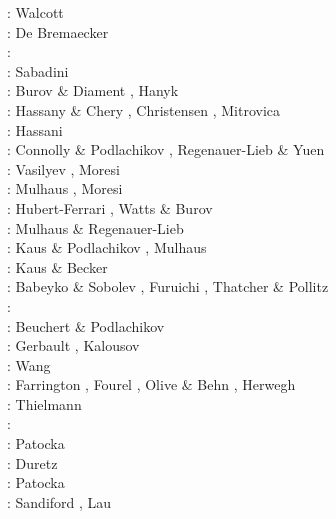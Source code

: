 \begin{scriptsize}
\nineteenseventy: Walcott \cite{walc70} \\
\nineteenseventyseven: De Bremaecker \cite{debr77}\\
\nineteeneightyfour:\cite{yusa84}\\
\nineteeneightysix: Sabadini \etal \cite{sayp86}\\
\nineteenninetyfive: Burov \& Diament \cite{budi95}, Hanyk \etal \cite{hamy95}\\
\nineteenninetysix: Hassany \& Chery \cite{hach96b}, Christensen \cite{chri96b}, Mitrovica \cite{mitr96}\\
\nineteenninetyseven: Hassani \etal \cite{hajc97}\\
\nineteenninetyeight: Connolly \& Podlachikov \cite{copo98}, Regenauer-Lieb \& Yuen \cite{reyu98}\\
\twothousandone: Vasilyev \etal \cite{vapy01}, Moresi \etal \cite{modm01}\\
\twothousandtwo: Mulhaus \etal \cite{mumh02}, Moresi \etal \cite{modm02}\\
\twothousandthree: Hubert-Ferrari \etal \cite{hukm03}, Watts \& Burov \cite{wabu03}\\
\twothousandfive: Mulhaus \& Regenauer-Lieb \cite{mure05}\\
\twothousandsix: Kaus \& Podlachikov \cite{kapo06}, Mulhaus \etal \cite{mudm06}\\
\twothousandseven: Kaus \& Becker \cite{kabe07}\\
\twothousandeight: Babeyko \& Sobolev \cite{baso08}, Furuichi \etal \cite{fukk08}, 
                   Thatcher \& Pollitz \cite{thpo08}\\
\twothousandnine: \cite{qurj09}\\
\twothousandten: Beuchert \& Podlachikov \cite{bepo10}\\
\twothousandtwelve: Gerbault \cite{gerb12}, Kalousov \etal \cite{kasc12}\\
\twothousandthirteen: Wang \etal \cite{wahd13}\\
\twothousandfourteen: Farrington \etal \cite{famc14}, Fourel \etal \cite{fogm14},
                      Olive \& Behn \cite{olbe14}, Herwegh \etal \cite{hepk14}\\
\twothousandfifteen: Thielmann \etal \cite{thkp15}\\
\twothousandsixteen: \cite{bafl16}\cite{jads16}\cite{olbm16}\cite{bafl16}\\
\twothousandseventeen: Patocka \cite{pact17}\\
\twothousandeighteen: Duretz \etal \cite{dusd18}\\
\twothousandnineteen: Patocka \etal \cite{pact19}\\
\twothousandtwenty: Sandiford \etal \cite{sams20}, Lau \etal \cite{lahh20}
\end{scriptsize}


